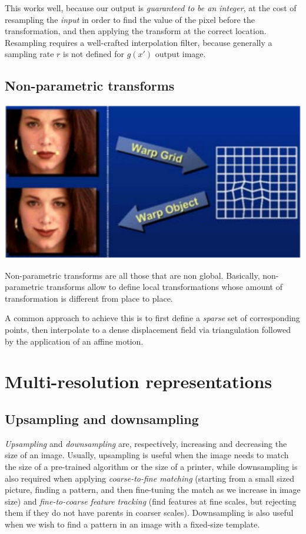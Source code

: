 \documentclass[10pt]{report}
\begin{document}
This works well, because our output is \emph{guaranteed to be an integer}, at
the cost of resampling the \emph{input} in order to find the value of the
pixel before the transformation, and then applying the transform at the
correct location. Resampling requires a well-crafted interpolation
filter, because generally a sampling rate \(r\) is not defined for
\(g(x')\) output image.

\subsection{Non-parametric transforms}
\label{sec:org1af1acf}
\begin{center}
\includegraphics[width=.9\linewidth]{./pics/proc/non-parametric-transform.jpg}
\end{center}

Non-parametric transforms are all those that are non global. Basically,
non-parametric transforms allow to define local transformations whose
amount of transformation is different from place to place.

A common approach to achieve this is to first define a \emph{sparse} set of
corresponding points, then interpolate to a dense displacement field via
triangulation followed by the application of an affine motion.

\section{Multi-resolution representations}
\label{sec:org210d0d7}
\subsection{Upsampling and downsampling}
\label{sec:org5e0c493}
\emph{Upsampling} and \emph{downsampling} are, respectively, increasing and
decreasing the size of an image. Usually, upsampling is useful when the
image needs to match the size of a pre-trained algorithm or the size of
a printer, while downsampling is also required when applying
\emph{coarse-to-fine matching} (starting from a small sized picture, finding
a pattern, and then fine-tuning the match as we increase in image size)
and \emph{fine-to-coarse feature tracking} (find features at fine scales, but
rejecting them if they do not have parents in coarser scales).
Downsampling is also useful when we wish to find a pattern in an image
with a fixed-size template.
\end{document}
